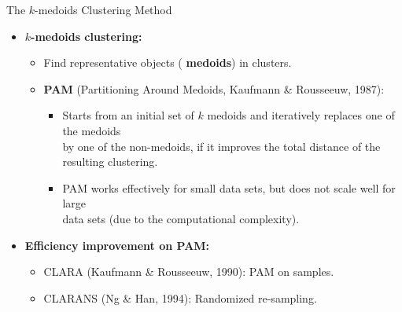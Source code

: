\begin{frame}{The $k$-medoids Clustering Method}
	\begin{itemize}
		\item \textbf{$k$-medoids clustering:}
		      \begin{itemize}
			      \item Find representative objects ( \textbf{\color{airforceblue}medoids}) in clusters.
			      \item \textbf{PAM} (Partitioning Around Medoids, Kaufmann \&
			            Rousseeuw, 1987):
			            \begin{itemize}
				            \item Starts from an initial set of $k$ medoids and iteratively
				                  replaces one of the medoids \\
				                  by one of the non-medoids, if it improves the total distance of
				                  the resulting clustering.
				            \item PAM works effectively for small data sets, but does not
				                  scale well for large\\
				                  data sets (due to the computational complexity).
			            \end{itemize}
		      \end{itemize}
		\item \textbf{Efficiency improvement on PAM:}
		      \begin{itemize}
			      \item CLARA (Kaufmann \& Rousseeuw, 1990): PAM on samples.
			      \item CLARANS (Ng \& Han, 1994): Randomized re-sampling.
		      \end{itemize}
	\end{itemize}
\end{frame}

